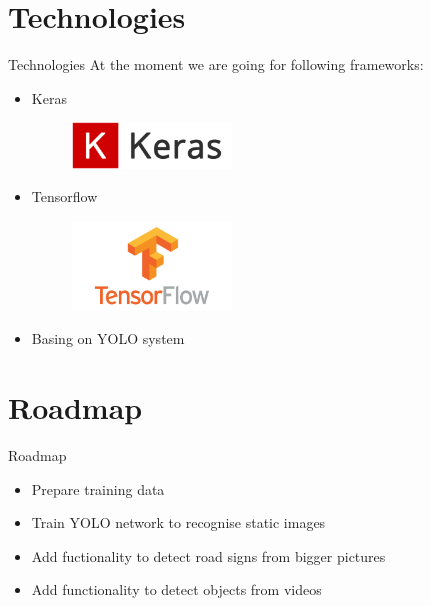 \part{Technologies}
\begin{frame}[allowframebreaks]{Technologies}
  At the moment we are going for following frameworks:
  \begin{itemize}
  \item Keras
    \begin{figure}[H]
      \centering \includegraphics[width = 0.4\textwidth]{keras}
    \end{figure}
  \item Tensorflow
    \begin{figure}[H]
      \centering \includegraphics[width = 0.4\textwidth]{tensorflow}
    \end{figure}
  \item Basing on YOLO system
  \end{itemize}
\end{frame}
\part{Roadmap}
\begin{frame}{Roadmap}
  \begin{itemize}
  \item Prepare training data
  \item Train YOLO network to recognise static images
  \item Add fuctionality to detect road signs from bigger pictures
  \item Add functionality to detect objects from videos
  \end{itemize}
\end{frame}


